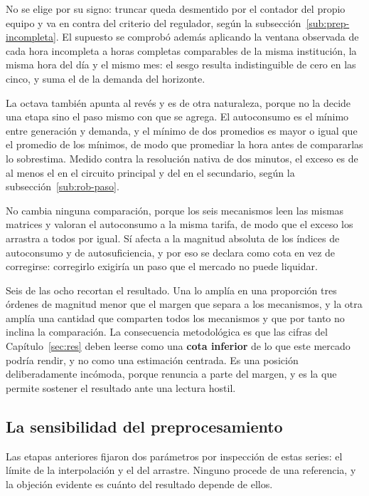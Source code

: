 No se elige por su signo: truncar queda desmentido por el contador del
propio equipo y va en contra del criterio del regulador, según la
subsección~\ref{sub:prep-incompleta}. El supuesto se comprobó además
aplicando la ventana observada de cada hora incompleta a horas completas
comparables de la misma institución, la misma hora del día y el mismo mes:
el sesgo resulta indistinguible de cero en las cinco, y suma el
 de la demanda del horizonte.

La octava también apunta al revés y es de otra naturaleza, porque no la
decide una etapa sino el paso mismo con que se agrega. El autoconsumo es el
mínimo entre generación y demanda, y el mínimo de dos promedios es mayor o
igual que el promedio de los mínimos, de modo que promediar la hora antes
de compararlas lo sobrestima. Medido contra la resolución nativa de dos
minutos, el exceso es de al menos el  en el circuito principal y
del  en el secundario, según la
subsección~\ref{sub:rob-paso}.

No cambia ninguna comparación, porque los seis mecanismos leen las mismas
matrices y valoran el autoconsumo a la misma tarifa, de modo que el exceso
los arrastra a todos por igual. Sí afecta a la magnitud absoluta de los
índices de autoconsumo y de autosuficiencia, y por eso se declara como cota
en vez de corregirse: corregirlo exigiría un paso que el mercado no puede
liquidar.

Seis de las ocho recortan el resultado. Una lo amplía en una
proporción tres órdenes de magnitud menor que el margen que separa a los
mecanismos, y la otra amplía una cantidad que comparten todos los
mecanismos y que por tanto no inclina la comparación. La
consecuencia metodológica es que las cifras del Capítulo~\ref{sec:res}
deben leerse como una \textbf{cota inferior} de lo que este mercado podría
rendir, y no como una estimación centrada. Es una posición deliberadamente incómoda, porque renuncia a parte del
margen, y es la que permite sostener el resultado ante una lectura
hostil.

\subsection{La sensibilidad del preprocesamiento}
\label{sub:prep-sensib}

Las etapas anteriores fijaron dos parámetros por inspección de estas
series: el límite de la interpolación y el del arrastre. Ninguno procede de
una referencia, y la objeción evidente es cuánto del resultado depende de
ellos.

